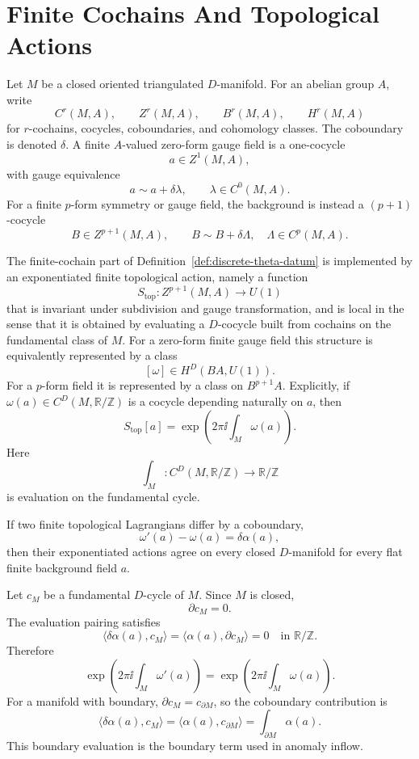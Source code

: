 \section{Finite Cochains And Topological Actions}

Let \(M\) be a closed oriented triangulated \(D\)-manifold.  For an abelian
group \(A\), write
\[
  C^r(M,A),\qquad Z^r(M,A),\qquad B^r(M,A),\qquad H^r(M,A)
\]
for \(r\)-cochains, cocycles, coboundaries, and cohomology classes.  The
coboundary is denoted \(\delta\).  A finite \(A\)-valued zero-form gauge
field is a one-cocycle
\[
  a\in Z^1(M,A),
\]
with gauge equivalence
\[
  a\sim a+\delta\lambda,\qquad \lambda\in C^0(M,A).
\]
For a finite \(p\)-form symmetry or gauge field, the background is instead a
\((p+1)\)-cocycle
\[
  B\in Z^{p+1}(M,A),
  \qquad
  B\sim B+\delta\Lambda,\quad \Lambda\in C^p(M,A).
\]

The finite-cochain part of Definition~\ref{def:discrete-theta-datum} is
implemented by an exponentiated finite topological action, namely a function
\[
  S_{\mathrm{top}}:Z^{p+1}(M,A)\longrightarrow U(1)
\]
that is invariant under subdivision and gauge transformation, and is local in
the sense that it is obtained by evaluating a \(D\)-cocycle built from
cochains on the fundamental class of \(M\).  For a zero-form finite gauge
field this structure is equivalently represented by a class
\[
  [\omega]\in H^D(BA,U(1)).
\]
For a \(p\)-form field it is represented by a class on \(B^{p+1}A\).
Explicitly, if \(\omega(a)\in C^D(M,\mathbb R/\mathbb Z)\) is a cocycle
depending naturally on \(a\), then
\[
  S_{\mathrm{top}}[a]
  =
  \exp\left(2\pi\ii\int_M\omega(a)\right).
\]
Here
\[
  \int_M:C^D(M,\mathbb R/\mathbb Z)\longrightarrow\mathbb R/\mathbb Z
\]
is evaluation on the fundamental cycle.

\begin{remark}
\label{rem:discrete-theta-coboundary-invariance}
If two finite topological Lagrangians differ by a coboundary,
\[
  \omega'(a)-\omega(a)=\delta\alpha(a),
\]
then their exponentiated actions agree on every closed \(D\)-manifold for
every flat finite background field \(a\).

Let \(c_M\) be a fundamental \(D\)-cycle of \(M\).  Since \(M\) is closed,
\[
  \partial c_M=0.
\]
The evaluation pairing satisfies
\[
  \langle\delta\alpha(a),c_M\rangle
  =
  \langle\alpha(a),\partial c_M\rangle
  =
  0
  \quad\text{in }\mathbb R/\mathbb Z .
\]
Therefore
\[
  \exp\left(2\pi\ii\int_M\omega'(a)\right)
  =
  \exp\left(2\pi\ii\int_M\omega(a)\right).
\]
For a manifold with boundary, \(\partial c_M=c_{\partial M}\), so the
coboundary contribution is
\[
  \langle\delta\alpha(a),c_M\rangle
  =
  \langle\alpha(a),c_{\partial M}\rangle
  =
  \int_{\partial M}\alpha(a).
\]
This boundary evaluation is the boundary term used in anomaly inflow.
\end{remark}

